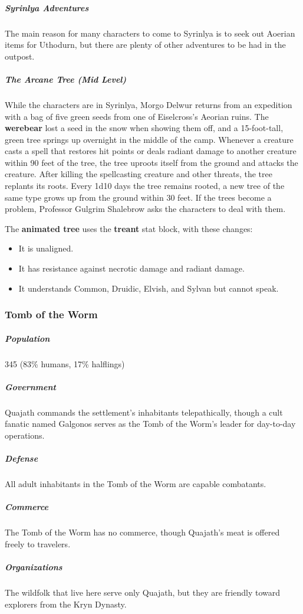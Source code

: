 \documentclass[10pt,a4paper,twoside,bg=print,twocolumn,openany,nodeprecatedcode]{dndbook}
\begin{document}
\subparagraph{Syrinlya Adventures}
The main reason for many characters to come to Syrinlya is to seek out Aoerian items for Uthodurn, but there are plenty of other adventures to be had in the outpost.

\subparagraph{The Arcane Tree (Mid Level)}
While the characters are in Syrinlya, Morgo Delwur returns from an expedition with a bag of five green seeds from one of Eiselcross's Aeorian ruins. The \textbf{werebear} lost a seed in the snow when showing them off, and a 15-foot-tall, green tree springs up overnight in the middle of the camp. Whenever a creature casts a spell that restores hit points or deals radiant damage to another creature within 90 feet of the tree, the tree uproots itself from the ground and attacks the creature. After killing the spellcasting creature and other threats, the tree replants its roots. Every 1d10 days the tree remains rooted, a new tree of the same type grows up from the ground within 30 feet. If the trees become a problem, Professor Gulgrim Shalebrow asks the characters to deal with them.

The \textbf{animated tree} uses the \textbf{treant} stat block, with these changes:


\begin{itemize}
\item It is unaligned.
\item It has resistance against necrotic damage and radiant damage.
\item It understands Common, Druidic, Elvish, and Sylvan but cannot speak.
\end{itemize}

\subsubsection{Tomb of the Worm}
\subparagraph{Population}
345 (83\% humans, 17\% halflings)

\subparagraph{Government}
Quajath commands the settlement's inhabitants telepathically, though a cult fanatic named Galgonos serves as the Tomb of the Worm's leader for day-to-day operations.

\subparagraph{Defense}
All adult inhabitants in the Tomb of the Worm are capable combatants.

\subparagraph{Commerce}
The Tomb of the Worm has no commerce, though Quajath's meat is offered freely to travelers.

\subparagraph{Organizations}
The wildfolk that live here serve only Quajath, but they are friendly toward explorers from the Kryn Dynasty.
\end{document}
